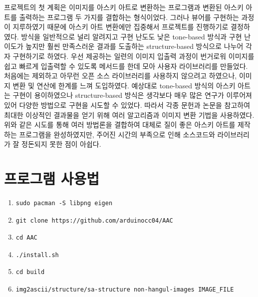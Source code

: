 \documentclass[conference]{IEEEtran}
\begin{document}
프로젝트의 첫 계획은 이미지를 아스키 아트로 변환하는 프로그램과 변환된 아스키 아트를 출력하는 프로그램 두 가지를 결합하는 형식이었다.
그러나  뷰어를 구현하는 과정이 지루하였기 때문에 아스키 아트 변환에만 집중해서 프로젝트를 진행하기로 결정하였다.
방식을 일반적으로 널리 알려지고 구현 난도도 낮은 tone-based 방식과 구현 난이도가 높지만 훨씬 만족스러운 결과를 도출하는 structure-based 방식으로 나누어 각자 구현하기로 하였다.
우선  제공하는 일련의 이미지 입출력 과정이 번거로워 이미지를 쉽고 빠르게 입출력할 수 있도록  메서드를 한데 모아 사용자 라이브러리를 만들었다.
처음에는  제외하고 아무런 오픈 소스 라이브러리를 사용하지 않으려고 하였으나,  이미지 변환 및 연산에 한계를 느껴  도입하였다.
예상대로 tone-based 방식의 아스키 아트는 구현이 용이하였으나 structure-based 방식은 생각보다 매우 많은 연구가 이루어져 있어 다양한 방법으로 구현을 시도할 수 있었다.
따라서 각종 문헌과 논문을 참고하여 최대한 이상적인 결과물을 얻기 위해 여러 알고리즘과 이미지 변환 기법을 사용하였다.
위와 같은 시도를 통해 여러 방법론을 결합하여 대체로 질이 좋은 아스키 아트를 제작하는 프로그램을 완성하였지만, 주어진 시간의 부족으로 인해 소스코드와 라이브러리가 잘 정돈되지 못한 점이 아쉽다.

\section{프로그램 사용법}
\begin{enumerate}
\item \begin{verbatim}sudo pacman -S libpng eigen\end{verbatim}
\item \begin{verbatim}git clone https://github.com/arduinocc04/AAC\end{verbatim}
\item \begin{verbatim}cd AAC\end{verbatim}
\item \begin{verbatim}./install.sh\end{verbatim}
\item \begin{verbatim}cd build \end{verbatim}
\item \begin{verbatim}img2ascii/structure/sa-structure non-hangul-images IMAGE_FILE\end{verbatim}
\end{enumerate}

\begin{thebibliography}{00}
\end{thebibliography}
\end{document}
